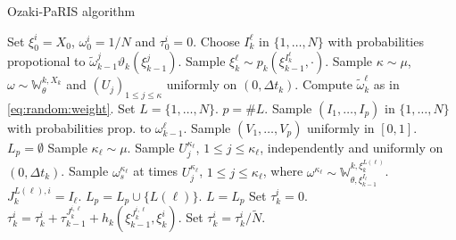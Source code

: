 \documentclass[12pt]{article}
\newcommand{\1}{\mathrm{1}}
\begin{document}
\begin{algorithm}
\caption{Ozaki-PaRIS algorithm}
\begin{algorithmic}
\STATE Set $\xi_0^i = X_0$, $\omega_0^i = 1/N$ and $\tau_0^i = 0$.
\ENDFOR
{}
\STATE Choose $I_k^{\ell}$ in $\{1,\ldots,N\}$ with probabilities propotional to $\widetilde{\omega}_{k-1}^j\vartheta_k(\xi_{k-1}^j)$.
\STATE Sample $\xi_k^{\ell} \sim p_k(\xi_{k-1}^{I_k^{\ell}},\cdot)$.
\STATE Sample $\kappa \sim \mu$, $\omega\sim \mathbb{W}_{\theta}^{k,X_{k}}$ and $(U_j)_{1\le j\le \kappa}$ uniformly on $(0,\Delta t_k)$.
\STATE Compute $\widetilde{\omega}^{\ell}_k$ as in \eqref{eq:random:weight}.
\ENDFOR
{}
\STATE Set $L =\{1,\ldots,N\}$. 
\STATE $p = \#L$.
\STATE Sample $(I_1,\ldots,I_p)$ in $\{1,\ldots,N\}$ with probabilities prop. to $\omega_{k-1}^{\ell}$.
\STATE Sample $(V_1,\ldots,V_p)$ uniformly in $[0,1]$.
\STATE $L_p = \emptyset$
\STATE Sample $\kappa_{\ell}\sim \mu$.
\STATE Sample $U^{\kappa_{\ell}}_j$, $1\le j\le \kappa_{\ell}$, independently and uniformly on $(0,\Delta t_k)$.
\STATE Sample $\omega^{\kappa_{\ell}}_{s}$ at times $U^{\kappa_{\ell}}_j$, $1\le j\le \kappa_{\ell}$, where $\omega^{\kappa_{\ell}}\sim \mathbb{W}_{\theta,\xi_{k-1}^{I_\ell}}^{k,\xi_k^{L(\ell)}}$.
\STATE $J_k^{L(\ell),i} = I_\ell$.
\ELSE
\STATE $L_p = L_p \cup \{L(\ell)\}$.
\ENDIF
\ENDFOR
\STATE $L = L_p$
\ENDWHILE
\ENDFOR
{}
\STATE Set $\tau_k^i = 0$.
\STATE $\tau_k^i = \tau_k^i + \tau^{J_k^{i,\ell}}_{k-1} + h_k(\xi^{J_k^{i,\ell}}_{k-1},\xi^i_k)$.%
\ENDFOR
\STATE Set $\tau^{i}_{k} = \tau^{i}_{k}/\widetilde{N}$.
\ENDFOR
\ENDFOR
\end{algorithmic}
\label{alg:Ozaki:PaRIS}
\end{algorithm}
\end{document}
